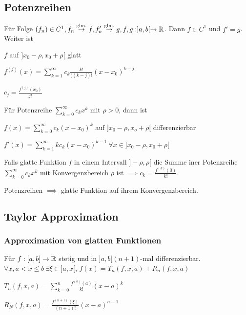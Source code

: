 \subsection{Potenzreihen}
\begin{compactitem}
    \item Für Folge $(f_n) \in C^1, f_n \overset{\text{glm.}}{\to} f, f'_n \overset{\text{glm.}}{\to} g, f,g: ]a,b[ \to \mathbb{R}$. Dann $f \in C^1$ und $f'=g$. Weiter ist
        \begin{inparaitem}
            \item $f$ auf $]x_0 - \rho, x_0 + \rho[$ glatt
            \item $f^{(j)} (x) = \sum_{k=1}^{\infty} c_k \frac{k!}{((k-j)!} (x - x_0)^{k-j}$
            \item $c_j = \frac{f^{(j)}(x_0)}{j!}$
        \end{inparaitem}
    \item Für Potenzreihe $\sum_{k=0}^{\infty} c_kx^k$ mit $\rho > 0$, dann ist
        \begin{inparaitem}
            \item $f(x) = \sum_{k=0}^{\infty} c_k (x - x_0)^k$ auf $]x_0 - \rho, x_o + \rho[$ differenzierbar
            \item $f'(x) = \sum_{k=1}^{\infty} kc_k ( x - x_0)^{k-1} \ \forall x \in ]x_0 - \rho, x_0 + \rho[$
        \end{inparaitem}
    \item Falls glatte Funktion $f$ in einem Intervall $]-\rho, \rho[$ die Summe iner Potenzreihe $\sum_{k=0}^{\infty} c_kx^k$ mit Konvergenzbereich $\rho$ ist $\implies c_k=\frac{f^{(k)}(0)}{k!}$.
    \item Potenzreihen $\implies$ glatte Funktion auf ihrem Konvergenzbereich.
\end{compactitem}

\subsection{Taylor Approximation}
\subsubsection{Approximation von glatten Funktionen}
Für $f:[a,b] \to \mathbb{R}$ stetig und in $]a,b[ (n + 1)$-mal differenzierbar. $\forall x, a < x \le b \ \exists \xi \in ]a, x[$, $f(x)= T_n(f,x,a) + R_n(f,x,a)$
\begin{inparaitem}
\item $T_n(f,x,a) = \sum_{k=0}^{n} \frac{f^{(k)}(a)}{k!} (x-a)^k$
    \item $R_N(f,x,a) = \frac{f^{(n+1)}(\xi)}{(n+1)!}(x-a)^{n+1}$
\end{inparaitem}

